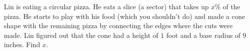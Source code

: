 Lin is eating a circular pizza. He eats a slice (a sector) that takes up $x\%$ of the pizza. He starts to play with his food (which you shouldn't do) and made a cone shape with the remaining pizza by connecting the edges where the cuts were made. Lin figured out that the cone had a height of $1$ foot and a base radius of $9$ inches. Find $x$.
